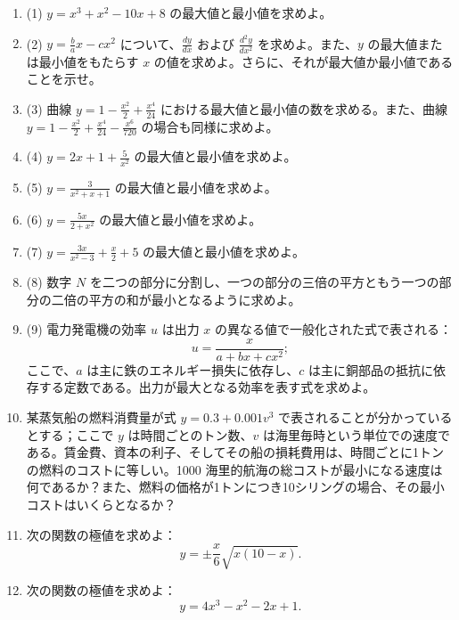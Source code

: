 \documentclass[a4paper,11pt,openany]{ltjsbook}
\begin{document}
\begin{enumerate}
\item (1) $y = x^3 + x^2 - 10x + 8$ の最大値と最小値を求めよ。
\item (2) $y = \frac{b}{a}x - cx^2$ について、$\frac{dy}{dx}$ および $\frac{d^2y}{dx^2}$ を求めよ。また、$y$ の最大値または最小値をもたらす $x$ の値を求めよ。さらに、それが最大値か最小値であることを示せ。
\item (3) 曲線 $y = 1 - \frac{x^2}{2} + \frac{x^4}{24}$ における最大値と最小値の数を求める。また、曲線 $y = 1 - \frac{x^2}{2} + \frac{x^4}{24} - \frac{x^6}{720}$ の場合も同様に求めよ。
\item (4) $y=2x+1+\frac{5}{x^2}$ の最大値と最小値を求めよ。
\item (5) $y=\frac{3}{x^2+x+1}$ の最大値と最小値を求めよ。
\item (6) $y=\frac{5x}{2+x^2}$ の最大値と最小値を求めよ。
\item (7) $y=\frac{3x}{x^2-3} + \frac{x}{2} + 5$ の最大値と最小値を求めよ。
\item (8) 数字 $N$ を二つの部分に分割し、一つの部分の三倍の平方ともう一つの部分の二倍の平方の和が最小となるように求めよ。
\item (9) 電力発電機の効率 $u$ は出力 $x$ の異なる値で一般化された式で表される：
\[
u=\frac{x}{a+bx+cx^2};
\]
ここで、$a$ は主に鉄のエネルギー損失に依存し、$c$ は主に銅部品の抵抗に依存する定数である。出力が最大となる効率を表す式を求めよ。

\item[(10)] 某蒸気船の燃料消費量が式 $y = 0.3 + 0.001v^3$ で表されることが分かっているとする；ここで $y$ は時間ごとのトン数、$v$ は海里毎時という単位での速度である。賃金費、資本の利子、そしてその船の損耗費用は、時間ごとに1トンの燃料のコストに等しい。1000 海里的航海の総コストが最小になる速度は何であるか？また、燃料の価格が1トンにつき10シリングの場合、その最小コストはいくらとなるか？

\item[(11)] 次の関数の極値を求めよ：
\[
y = ±\frac{x}{6}\sqrt{x(10-x)}.
\]

\item[(12)] 次の関数の極値を求めよ：
\[
y= 4x^3 - x^2 - 2x + 1.
\]

\end{enumerate}
\end{document}
